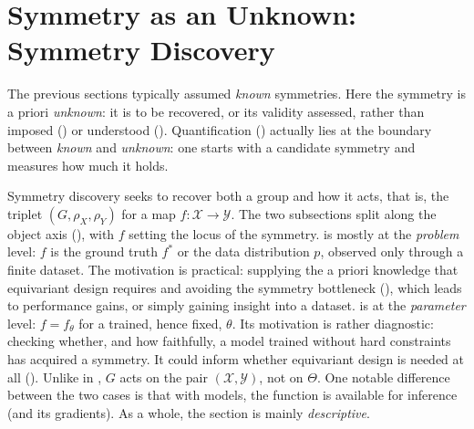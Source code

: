 \documentclass[mathematics,review,submit,moreauthors]{Definitions/mdpi}
\begin{document}
\section{Symmetry as an Unknown: Symmetry Discovery}\label{sec:sym-disco}
The previous sections typically assumed \emph{known} symmetries.
Here the symmetry is a priori \emph{unknown}: it is to be recovered, or its validity assessed, rather than imposed () or understood ().
Quantification () actually lies at the boundary between \emph{known} and \emph{unknown}: one starts with a candidate symmetry and measures how much it holds.

Symmetry discovery seeks to recover both a group and how it acts, that is, the triplet $(G,\rho_X,\rho_Y)$ for a map $f:\mathcal{X}\to \mathcal{Y}$.
The two subsections split along the object axis (), with $f$ setting the locus of the symmetry.
 is mostly at the \emph{problem} level: $f$ is the ground truth $f^*$ or the data distribution $p$, observed only through a finite dataset.
The motivation is practical: supplying the a priori knowledge that equivariant design requires and avoiding the symmetry bottleneck (), which leads to performance gains, or simply gaining insight into a dataset.
 is at the \emph{parameter} level: $f=f_\theta$ for a trained, hence fixed, $\theta$.
Its motivation is rather diagnostic: checking whether, and how faithfully, a model trained without hard constraints has acquired a symmetry.
It could inform whether equivariant design is needed at all ().
Unlike in , $G$ acts on the pair $(\mathcal X,\mathcal Y)$, not on $\Theta$.
One notable difference between the two cases is that with models, the function is available for inference (and its gradients).
As a whole, the section is mainly \emph{descriptive}.
\end{document}
